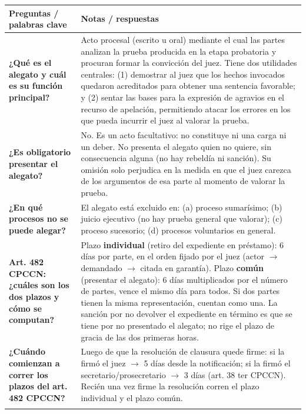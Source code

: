 \documentclass[12pt,oneside]{book}
\begin{document}
\begin{table}[H]
\centering
\begin{tabularx}{\textwidth}{
    >{\raggedright\arraybackslash}p{}
    >{\raggedright\arraybackslash}X
}
\toprule
\textbf{Preguntas / palabras clave} & \textbf{Notas / respuestas} \\
\midrule

\textbf{¿Qué es el alegato y cuál es su función principal?} &
Acto procesal (escrito u oral) mediante el cual las partes analizan la prueba producida en la etapa probatoria y procuran formar la convicción del juez. Tiene dos utilidades centrales: (1) demostrar al juez que los hechos invocados quedaron acreditados para obtener una sentencia favorable; y (2) sentar las bases para la expresión de agravios en el recurso de apelación, permitiendo atacar los errores en los que pueda incurrir el juez al valorar la prueba. \\
\addlinespace

\textbf{¿Es obligatorio presentar el alegato?} &
No. Es un acto facultativo: no constituye ni una carga ni un deber. No presenta el alegato quien no quiere, sin consecuencia alguna (no hay rebeldía ni sanción). Su omisión solo perjudica en la medida en que el juez carezca de los argumentos de esa parte al momento de valorar la prueba. \\
\addlinespace

\textbf{¿En qué procesos no se puede alegar?} &
El alegato está excluido en: (a) proceso sumarísimo; (b) juicio ejecutivo (no hay prueba general que valorar); (c) proceso sucesorio; (d) procesos voluntarios en general. \\
\addlinespace

\textbf{Art. 482 CPCCN: ¿cuáles son los dos plazos y cómo se computan?} &
Plazo \textbf{individual} (retiro del expediente en préstamo): 6 días por parte, en el orden fijado por el juez (actor $\to$ demandado $\to$ citada en garantía). Plazo \textbf{común} (presentar el alegato): 6 días multiplicados por el número de partes, vence el mismo día para todos. Si dos partes tienen la misma representación, cuentan como una. La sanción por no devolver el expediente en término es que se tiene por no presentado el alegato; no rige el plazo de gracia de las dos primeras horas. \\
\addlinespace

\textbf{¿Cuándo comienzan a correr los plazos del art. 482 CPCCN?} &
Luego de que la resolución de clausura quede firme: si la firmó el juez $\to$ 5 días desde la notificación; si la firmó el secretario/prosecretario $\to$ 3 días (art. 38 ter CPCCN). Recién una vez firme la resolución corren el plazo individual y el plazo común. \\
\addlinespace


\end{tabularx}
\end{table}
\end{document}
